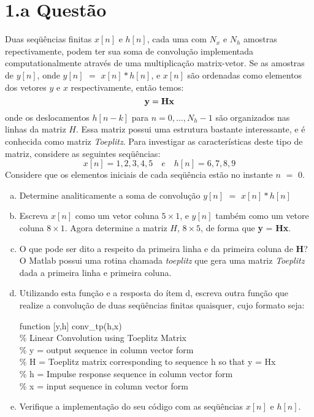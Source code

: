 \section*{1.a Questão}
\label{sec:q1}

Duas seqüências finitas $x[n]$ e $h[n]$, cada uma com $N_x$ e $N_h$ amostras
repectivamente, podem ter sua soma de convolução implementada
computationalmente através de uma multiplicação matrix-vetor. Se as amostras de
$y[n]$, onde $y[n]$ $=$ $x[n] \ast h[n]$, e $x[n]$ são ordenadas como elementos dos
vetores {\bf $y$} e {\bf $x$} respectivamente, então temos:
$$
{\bf y} = {\bf H}{\bf x}
$$
onde os deslocamentos $h[n - k]$ para $n = 0, \ldots, N_h - 1$ são organizados nas
linhas da matriz {\bf $H$}. Essa matriz possui uma estrutura bastante interessante, e
é conhecida como matriz \emph{Toeplitz}. Para investigar as características deste tipo
de matriz, considere as seguintes seqüências:
$$
x[n] = {1,2,3,4,5} \quad e \quad h[n] = {6,7,8,9}
$$
Considere que os elementos iniciais de cada seqüência estão no instante $n$ $ =$ $0$.

\begin{enumerate}[a.]
\item Determine analiticamente a soma de convolução $y[n]$ $=$ $x[n] \ast h[n]$
\item Escreva $x[n]$ como um vetor coluna $5 \times 1$, e $y[n]$ também como um
  vetore coluna  $8 \times 1$. Agora determine a matriz {\bf $H$}, $8 \times 5$, de
  forma que {\bf y} = {\bf H}{\bf x}.
\item O que pode ser dito a respeito da primeira linha e da primeira coluna de
  {\bf H}? O Matlab possui uma rotina chamada \emph{toeplitz} que gera uma
  matriz \emph{Toeplitz} dada a primeira linha e primeira coluna.
\item Utilizando esta função e a resposta do ítem d, escreva outra função que realize
  a convolução de duas seqüências finitas quaisquer, cujo formato seja:

  \vspace*{0.5cm}

  function [y,h] conv\_tp(h,x) \\
  \% Linear Convolution using Toeplitz Matrix \\
  \% y = output sequence in column vector form \\ 
  \% H = Toeplitz matrix  corresponding to sequence h so that y = Hx \\
  \% h = Impulse response sequence in column vector form \\
  \% x = input sequence in column vector form 

  \item Verifique a implementação do seu código com as seqüências $x[n]$ e $h[n]$.
\end{enumerate}

